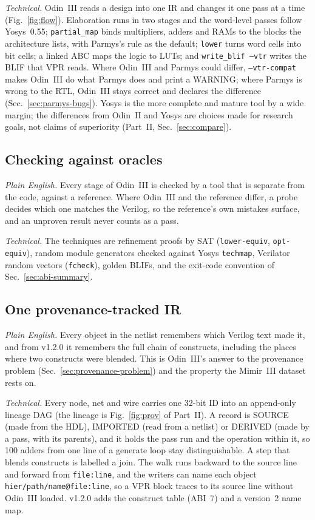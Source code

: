 \documentclass[conference]{IEEEtran}
\newcommand{\code}[1]{\texttt{#1}}
\begin{document}
\emph{Technical.} Odin~III reads a design into one IR and changes it one pass at a time (Fig.~\ref{fig:flow}). Elaboration runs in two stages and the word-level passes follow Yosys~0.55; \code{partial\_map} binds multipliers, adders and RAMs to the blocks the architecture lists, with Parmys's rule as the default; \code{lower} turns word cells into bit cells; a linked ABC maps the logic to LUTs; and \code{write\_blif --vtr} writes the BLIF that VPR reads. Where Odin~III and Parmys could differ, \code{--vtr-compat} makes Odin~III do what Parmys does and print a WARNING; where Parmys is wrong to the RTL, Odin~III stays correct and declares the difference (Sec.~\ref{sec:parmys-bugs}). Yosys is the more complete and mature tool by a wide margin; the differences from Odin~II and Yosys are choices made for research goals, not claims of superiority (Part~II, Sec.~\ref{sec:compare}).

\subsection{Checking against oracles}

\emph{Plain English.} Every stage of Odin~III is checked by a tool that is separate from the code, against a reference. Where Odin~III and the reference differ, a probe decides which one matches the Verilog, so the reference's own mistakes surface, and an unproven result never counts as a pass.

\emph{Technical.} The techniques are refinement proofs by SAT (\code{lower-equiv}, \code{opt-equiv}), random module generators checked against Yosys \code{techmap}, Verilator random vectors (\code{fcheck}), golden BLIFs, and the exit-code convention of Sec.~\ref{sec:abi-summary}.

\subsection{One provenance-tracked IR}

\emph{Plain English.} Every object in the netlist remembers which Verilog text made it, and from v1.2.0 it remembers the full chain of constructs, including the places where two constructs were blended. This is Odin~III's answer to the provenance problem (Sec.~\ref{sec:provenance-problem}) and the property the Mimir~III dataset rests on.

\emph{Technical.} Every node, net and wire carries one 32-bit ID into an append-only lineage DAG (the lineage is Fig.~\ref{fig:prov} of Part~II). A record is SOURCE (made from the HDL), IMPORTED (read from a netlist) or DERIVED (made by a pass, with its parents), and it holds the pass run and the operation within it, so 100 adders from one line of a generate loop stay distinguishable. A step that blends constructs is labelled a join. The walk runs backward to the source line and forward from \code{file:line}, and the writers can name each object \code{hier/path/name@file:line}, so a VPR block traces to its source line without Odin~III loaded. v1.2.0 adds the construct table (ABI~7) and a version~2 name map.
\end{document}
